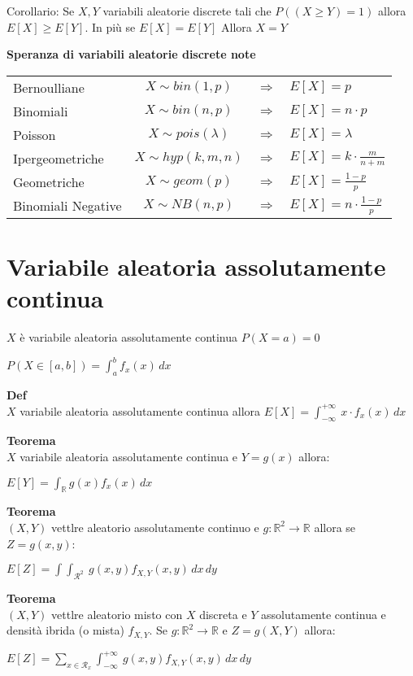 \documentclass[12pt, a4paper]{article}
\begin{document}
Corollario: Se $X,Y$ variabili aleatorie discrete tali che $P((X\geq Y)=1)$ allora $E[X]\geq E[Y]$. In più se $E[X]=E[Y]$ Allora
$X=Y$

\textbf{Speranza di variabili aleatorie discrete note}

\begin{tabular}{l c c l}
    Bernoulliane & $X\sim bin(1,p)$ & $\Rightarrow$ & $E[X]=p$\\
    Binomiali & $X\sim bin(n,p)$ & $\Rightarrow$ & $E[X]=n\cdot p$\\
    Poisson & $X\sim pois(\lambda)$ & $\Rightarrow$ & $E[X]=\lambda$\\
    Ipergeometriche & $X\sim hyp(k,m,n)$ & $\Rightarrow$ & $E[X]=k\cdot\frac{m}{n+m}$\\
    Geometriche & $X\sim geom(p)$ & $\Rightarrow$ & $E[X]=\frac{1-p}{p}$\\
    Binomiali Negative & $X\sim NB(n,p)$ & $\Rightarrow$ & $E[X]=n\cdot\frac{1-p}{p}$\\
\end{tabular}

\section{Variabile aleatoria assolutamente continua}
$X$ è variabile aleatoria assolutamente continua $P(X=a)=0$
\begin{center}
    $P(X\in[a,b])=\int_{a}^{b} f_{x}(x)\,dx $
\end{center}

\textbf{Def}\\ $X$ variabile aleatoria assolutamente continua allora $E[X]=\int_{-\infty}^{+\infty}\ x\cdot f_{x}(x) \,dx$

\newpage
\textbf{Teorema}\\$X$ variabile aleatoria assolutamente continua e $Y=g(x)$ allora:
\begin{center}
    $E[Y]=\int_{\mathbb{R}} g(x) f_{x}(x)\,dx$
\end{center}

\textbf{Teorema}\\$(X,Y)$ vettlre aleatorio assolutamente continuo e $g:\mathbb{R}^{2}\rightarrow\mathbb{R}$ allora se
$Z=g(x,y)$:
\begin{center}
    $E[Z]=\int\int_{\mathcal{R}^{2}}\ g(x,y)f_{X,Y}(x,y)\,dx\,dy$
\end{center}

\textbf{Teorema}\\$(X,Y)$ vettlre aleatorio misto con $X$ discreta e $Y$ assolutamente continua e densità ibrida (o mista)
$f_{X,Y}$. Se $g:\mathbb{R}^{2}\rightarrow\mathbb{R}$ e $Z=g(X,Y)$ allora:
\begin{center}
    $E[Z]=\sum_{x\in\mathcal{R}_{x}}\int_{-\infty}^{+\infty}\ g(x,y)f_{X,Y}(x,y)\,dx\,dy$
\end{center}
\end{document}
